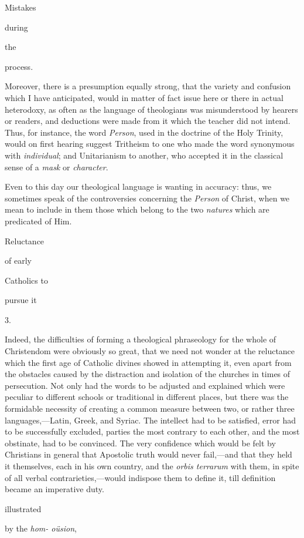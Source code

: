 Mistakes

during

the

process.

Moreover, there is a presumption equally
strong, that the variety and confusion which I have
anticipated, would in matter of fact issue here or there in
actual heterodoxy, as often as the language of theologians was
misunderstood by hearers or readers, and deductions were made
from it which the teacher did not intend. Thus, for instance,
the word \emph{Person}, used in the doctrine of the Holy
Trinity, would on first hearing suggest Tritheism to one who
made the word synonymous with \emph{individual}; and
Unitarianism to another, who accepted it in the classical
sense of a \emph{mask} or \emph{character}. 

Even to this day our theological language
is wanting in accuracy: thus, we sometimes speak of the
controversies concerning the \emph{Person} of Christ, when we
mean to include in them those which belong to the two \emph{natures}
which are predicated of Him.

Reluctance

of
early

Catholics to

pursue
it

3.

Indeed, the difficulties of forming a
theological phraseology for the whole of Christendom were
obviously so great, that we need not wonder at the reluctance
which the first age of Catholic divines showed in attempting
it, even apart from the obstacles caused by the distraction
and isolation of the churches in times of persecution. Not
only had the words to be adjusted and explained which were
peculiar to different schools or traditional in different
places, but there was the formidable necessity of creating a
common measure between two, or rather three
languages,—Latin, Greek, and Syriac. The intellect had to be
satisfied, error had to be successfully excluded, parties the
most contrary to each other, and the most obstinate, had to be
convinced. The very confidence which would be felt by
Christians in general that Apostolic truth would never
fail,—and that they held it themselves, each in his own
country, and the \emph{orbis terrarum} with them, in spite of
all verbal contrarieties,—would indispose them to define it,
till definition became an imperative duty.

illustrated

by the \emph{hom- oüsion},

